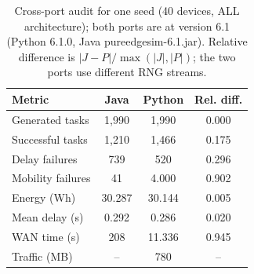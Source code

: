 \begin{table}[t]
\centering
\small
\caption{Cross-port audit for one seed (40 devices, ALL architecture); both ports are at version 6.1 (Python 6.1.0, Java pureedgesim-6.1.jar). Relative difference is $|J-P|/\max(|J|,|P|)$; the two ports use different RNG streams.}
\label{tab:p1-parity}
\begin{tabular}{lccc}
\toprule
Metric & Java & Python & Rel. diff. \\
\midrule
Generated tasks & 1,990 & 1,990 & 0.000 \\
Successful tasks & 1,210 & 1,466 & 0.175 \\
Delay failures & 739 & 520 & 0.296 \\
Mobility failures & 41 & 4.000 & 0.902 \\
Energy (Wh) & 30.287 & 30.144 & 0.005 \\
Mean delay (s) & 0.292 & 0.286 & 0.020 \\
WAN time (s) & 208 & 11.336 & 0.945 \\
Traffic (MB) & -- & 780 & -- \\
\bottomrule
\end{tabular}
\end{table}
